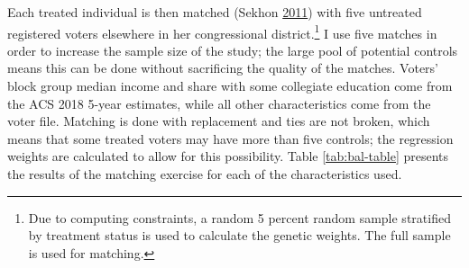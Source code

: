 \documentclass[
  12pt,
]{article}
\begin{document}
Each treated individual is then matched (Sekhon \protect\hyperlink{ref-Sekhon2011}{2011}) with five untreated registered voters elsewhere in her congressional district.\footnote{Due to computing constraints, a random 5 percent random sample stratified by treatment status is used to calculate the genetic weights. The full sample is used for matching.} I use five matches in order to increase the sample size of the study; the large pool of potential controls means this can be done without sacrificing the quality of the matches. Voters' block group median income and share with some collegiate education come from the ACS 2018 5-year estimates, while all other characteristics come from the voter file. Matching is done with replacement and ties are not broken, which means that some treated voters may have more than five controls; the regression weights are calculated to allow for this possibility. Table \ref{tab:bal-table} presents the results of the matching exercise for each of the characteristics used.
\end{document}
